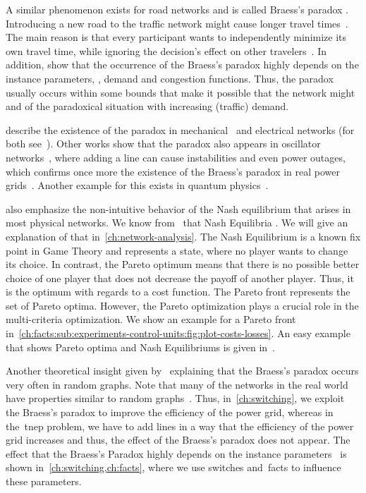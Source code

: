 A similar phenomenon exists for road networks and is called Braess's
para\-dox \parencite{Bra68,Bra05}. Introducing a new road to the traffic network
might cause longer travel times~\parencite{You08}. The main reason is that every
participant wants to independently minimize its own travel time, while ignoring
the decision's effect on other travelers~\parencite{Pas97}. In addition,
\textcite{Pas97} show that the occurrence of the Braess's paradox highly depends
on the instance parameters, \ie, demand and congestion functions. Thus, the
paradox usually occurs within some bounds that make it possible that the network
might  and  of the paradoxical situation
with increasing (traffic) demand. 

\textcite{Coh91} describe the existence of the paradox in
mechanical~\parencite{Pet12} and electrical networks (for both
see~\parencite{Pen03}). Other works show that the paradox also appears in
oscillator networks~\parencite{Wit12}, where adding a line can cause
instabilities and even power outages, which confirms once more the existence of
the Braess's paradox in real power grids~\parencite[p.11]{Wit12}. Another
example for this exists in quantum physics~\parencite{Pal12}.

\textcite{Coh91} also emphasize the non-intuitive behavior of the Nash
equilibrium that arises in most physical networks. We know from~\textcite[p.4;
Section 3]{Dub86} that Nash Equilibria . We will give an explanation of that
in~\cref{ch:network-analysis}. The Nash Equilibrium is a known fix point in Game
Theory and represents a state, where no player wants to change its choice. In
contrast, the Pareto optimum means that there is no possible better choice of
one player that does not decrease the payoff of another player. Thus, it is the
optimum with regards to a cost function. The Pareto front represents the set of
Pareto optima. However, the Pareto optimization plays a crucial role in the
multi-criteria optimization. We show an example for a Pareto front
in~\cref{ch:facts:sub:experiments-control-units:fig:plot-costs-losses}. An easy
example that shows Pareto optima and Nash Equilibriums is given
in~\textcite[p.5; Figures 2--4]{Dub86}.

Another theoretical insight given by~\textcite{Val06} explaining that the
Braess's paradox occurs very often in random graphs. Note that many of the
networks in the real world have properties similar to random
graphs~\parencite[p.xiii]{online:Hof19}. Thus, in~\cref{ch:switching}, we
exploit the Braess's paradox to improve the efficiency of the power grid,
whereas in the~\gls{tnep} problem, we have to add lines in a way that the
efficiency of the power grid increases and thus, the effect of the Braess's
paradox does not appear. The effect that the Braess's Paradox highly depends on
the instance parameters~\parencite{Pas97} is shown
in~\cref{ch:switching,ch:facts}, where we use switches and~\gls{facts} to
influence these parameters.
% 
